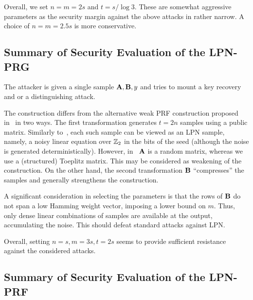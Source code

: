 Overall, we set $n=m=2s$ and $t = s/\log 3$.
These are somewhat aggressive parameters as the security margin against the above attacks
in rather narrow. A choice of $n=m=2.5s$ is more conservative.

\subsection{Summary of Security Evaluation of the LPN-PRG}

The attacker is given a single sample $\mat{A},\mat{B},y$
and tries to mount a key recovery and or a distinguishing attack.

The construction differs from 
the alternative weak PRF construction proposed
in~\cite{boneh2018-darkmatter} in two ways.
The first transformation generates $t = 2n$ samples using a public matrix.
Similarly to~\cite{boneh2018-darkmatter},
each such sample can be viewed as an LPN sample, namely,
a noisy linear equation over $\mathbb{Z}_2$ in the bits of the seed
(although the noise is generated deterministically).
However, in~\cite{boneh2018-darkmatter} $\mat{A}$ is a random matrix,
whereas we use a (structured) Toeplitz matrix.
This may be considered as weakening of the construction. 
On the other hand, the second transformation $\mat{B}$ ``compresses''
the samples and generally strengthens the construction.

A significant consideration in selecting the parameters is that
the rows of $\mat{B}$ do not span a low Hamming weight vector,
imposing a lower bound on $m$.
Thus, only dense linear combinations of samples are available at the output,
accumulating the noise. This should defeat standard attacks against LPN. 

Overall, setting 
$n=s, m = 3s, t = 2s$ seems to provide sufficient 
resistance against the considered attacks.



\subsection{Summary of Security Evaluation of the LPN-PRF}

